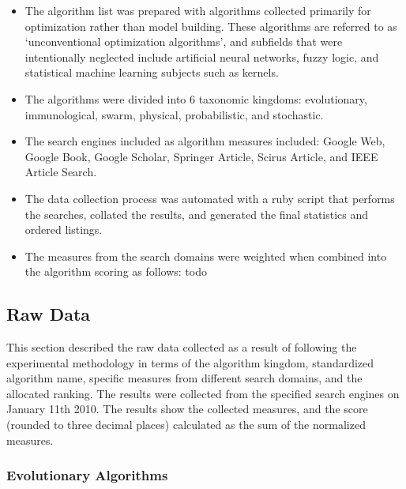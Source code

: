 \documentclass[a4paper, 11pt]{article}
\begin{document}
\begin{itemize}
	\item The algorithm list was prepared with algorithms collected primarily for optimization rather than model building. These algorithms are referred to as `unconventional optimization algorithms', and subfields that were intentionally neglected include artificial neural networks, fuzzy logic, and statistical machine learning subjects such as kernels.
	\item The algorithms were divided into 6 taxonomic kingdoms: evolutionary, immunological, swarm, physical, probabilistic, and stochastic.
	\item The search engines included as algorithm measures included: Google Web, Google Book, Google Scholar, Springer Article, Scirus Article, and IEEE Article Search.
	\item The data collection process was automated with a ruby script that performs the searches, collated the results, and generated the final statistics and ordered listings.
	\item The measures from the search domains were weighted when combined into the algorithm scoring as follows: todo
\end{itemize}

% 
% 
\subsection{Raw Data}
This section described the raw data collected as a result of following the experimental methodology in terms of the algorithm kingdom, standardized algorithm name, specific measures from different search domains, and the allocated ranking. The results were collected from the specified search engines on January 11th 2010. The results show the collected measures, and the score (rounded to three decimal places) calculated as the sum of the normalized measures.

\subsubsection{Evolutionary Algorithms}
\end{document}
